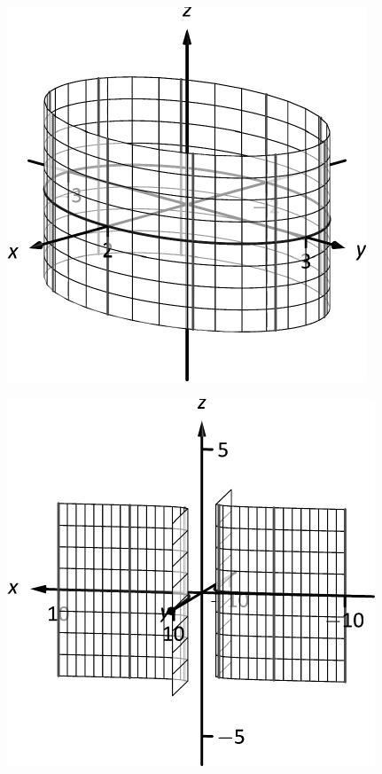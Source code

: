 \documentclass[10pt]{article}
\begin{document}
\includegraphics{fig10_01_ex_17_3DBW.pdf}
\texttt{}

\includegraphics{fig10_01_ex_18_3DBW.pdf}
\texttt{}
\end{document}
